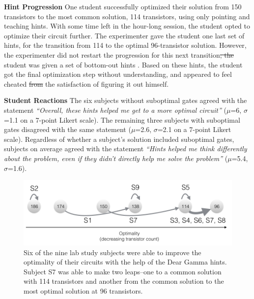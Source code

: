 \documentclass[12pt,twoside]{mitthesis}
\providecommand{\DIFaddtex}[1]{{\protect\color{blue}\uwave{#1}}} %
\providecommand{\DIFdeltex}[1]{{\protect\color{red}\sout{#1}}}                      %
\providecommand{\DIFaddbegin}{} %
\providecommand{\DIFaddend}{} %
\providecommand{\DIFdelbegin}{} %
\providecommand{\DIFdelend}{} %
\providecommand{\DIFadd}[1]{\texorpdfstring{\DIFaddtex{#1}}{#1}} %
\providecommand{\DIFdel}[1]{\texorpdfstring{\DIFdeltex{#1}}{}} %
\begin{document}
{\bf Hint Progression} One student successfully optimized their solution from 150 transistors to the most common solution, 114 transistors, using only pointing and teaching hints. With some time left in the hour-long session, the student opted to optimize their circuit further. The experimenter gave the student one last set of hints, for the transition from 114 to the optimal 96-transistor solution. However, the experimenter did not restart the progression for this next transition\DIFdelbegin \DIFdel{; the }\DIFdelend \DIFaddbegin \DIFadd{. The }\DIFaddend student was given a set of bottom-out hints \DIFaddbegin \DIFadd{instead}\DIFaddend . Based on these hints, the student got the final optimization step without understanding, and appeared to feel cheated \DIFdelbegin \DIFdel{from }\DIFdelend \DIFaddbegin \DIFadd{out of }\DIFaddend the satisfaction of figuring it out himself. 

{\bf Student Reactions} The six subjects without suboptimal gates agreed with the statement {\it ``Overall, these hints helped me get to a more optimal circuit''} ($\mu$=6, $\sigma$=1.1 on a 7-point Likert scale). The remaining three subjects with suboptimal gates disagreed with the same statement ($\mu$=2.6, $\sigma$=2.1 on a 7-point Likert scale). Regardless of whether a subject's solution included suboptimal gates, subjects on average agreed with the statement {\it ``Hints helped me think differently about the problem, even if they didn't directly help me solve the problem'' } ($\mu$=5.4, $\sigma$=1.6).



\begin{figure}
\centering
\includegraphics[width=1.0\columnwidth]{Body/figures/classoverflow/dearGammaResults.png}
\caption{Six of the nine lab study subjects were able to improve the optimality of their circuits with the help of the Dear Gamma hints. Subject S7 was able to make two leaps--one to a common solution with 114 transistors and another from the common solution to the most optimal solution at 96 transistors.}
\label{fig:gammaresults}
\end{figure}
\end{document}
